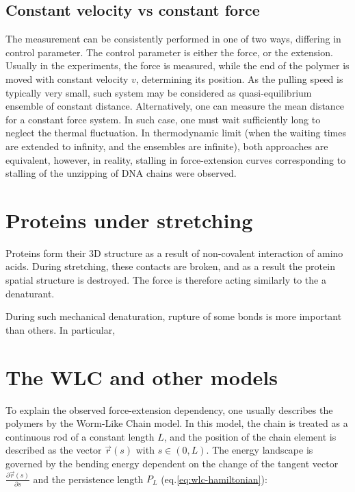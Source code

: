 \subsection{Constant velocity vs constant force}
\label{subsec:theory-single-constant}
The measurement can be consistently performed in one of two ways, differing in control parameter.
The control parameter is either the force, or the extension.
Usually in the experiments, the force is measured, while the end of the polymer is moved with constant velocity $v$, determining its position.
As the pulling speed is typically very small, such system may be considered as quasi-equilibrium ensemble of constant distance.
Alternatively, one can measure the mean distance for a constant force system.
In such case, one must wait sufficiently long to neglect the thermal fluctuation.
In thermodynamic limit (when the waiting times are extended to infinity, and the ensembles are infinite), both approaches are equivalent, however, in reality, stalling in force-extension curves corresponding to stalling of the unzipping of DNA chains were observed\cite{weeks2005pause}.

\section{Proteins under stretching}
\label{sec:theory-single-proteins}
Proteins form their 3D structure as a result of non-covalent interaction of amino acids.
During stretching, these contacts are broken, and as a result the protein spatial structure is destroyed.
The force is therefore acting similarly to the a denaturant.

During such mechanical denaturation, rupture of some bonds is more important than others.
In particular,

\section{The WLC and other models}
\label{sec:theory-wlc}
To explain the observed force-extension dependency, one usually describes the polymers by the Worm-Like Chain model.
In this model, the chain is treated as a continuous rod of a constant length $L$, and the position of the chain element is described as the vector $\overrightarrow{r}(s)$ with $s\in (0,L)$.
The energy landscape is governed by the bending energy dependent on the change of the tangent vector $\frac{\partial\overrightarrow{r}(s)}{\partial s}$ and the persistence length $P_L$ (eq.\ref{eq:wlc-hamiltonian}):

